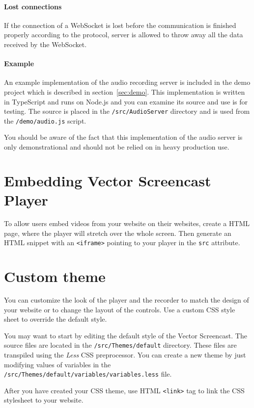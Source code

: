 \paragraph{Lost connections}
If the connection of a WebSocket is lost before the communication is finished properly according to the protocol, server is allowed to throw away all the data received by the WebSocket.

\paragraph{Example}
An example implementation of the audio recording server is included in the demo project which is described in section~\ref{sec:demo}. This implementation is written in TypeScript and runs on Node.js and you can examine its source and use is for testing. The source is placed in the \verb|/src/AudioServer| directory and is used from the \verb|/demo/audio.js| script.

You should be aware of the fact that this implementation of the audio server is only demonstrational and should not be relied on in heavy production use.

\section{Embedding Vector Screencast Player}
To allow users embed videos from your website on their websites, create a HTML page, where the player will stretch over the whole screen. Then generate an HTML snippet with an \verb|<iframe>| pointing to your player in the \verb|src| attribute.

\section{Custom theme}
You can customize the look of the player and the recorder to match the design of your website or to change the layout of the controls. Use a custom CSS style sheet to override the default style.

You may want to start by editing the default style of the Vector Screencast. The source files are located in the \verb|/src/Themes/default| directory. These files are transpiled using the \textit{Less} CSS preprocessor. You can create a new theme by just modifying values of variables in the \verb|/src/Themes/default/variables/variables.less| file.

After you have created your CSS theme, use HTML \verb|<link>| tag to link the CSS stylesheet to your website.

